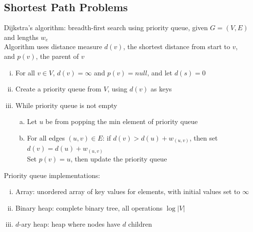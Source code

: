 \documentclass{article}
\begin{document}
		\subsection{Shortest Path Problems}
			Dijkstra's algorithm: breadth-first search using priority queue, given $G = (V, E)$ and lengths $w_e$ \\
			Algorithm uses distance measure $d(v)$, the shortest distance from start to $v$, and $p(v)$, the parent of $v$
			\begin{enumerate}[(i)]
				\item For all $v \in V$, $d(v) = \infty$ and $p(v) = null$, and let $d(s) = 0$
				\item Create a priority queue from $V$, using $d(v)$ as keys
				\item While priority queue is not empty
				\begin{enumerate}[(a)]
					\item Let $u$ be from popping the min element of priority queue
					\item For all edges $(u, v) \in E$: if $d(v) > d(u) + w_{(u, v)}$, then set $d(v) = d(u) + w_{(u, v)}$ \\
					Set $p(v) = u$, then update the priority queue
					\end{enumerate}
				\end{enumerate}
			Priority queue implementations:
			\begin{enumerate}[(i)]
				\item Array: unordered array of key values for elements, with initial values set to $\infty$
				\item Binary heap: complete binary tree, all operations $\log{|V|}$
				\item $d$-ary heap: heap where nodes have $d$ children
				\end{enumerate}
\end{document}
